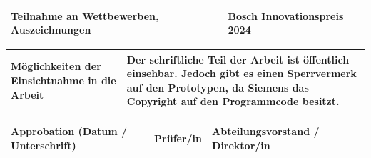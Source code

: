 \vspace{0.5cm}

\begin{tabular}{|p{53mm}|p{103mm}|}
\hline
\vspace{-0.11cm} Teilnahme an \newline Wettbewerben, \newline Auszeichnungen \vspace{0.11cm} &
\vspace{-0.11cm} Bosch Innovationspreis 2024 \vspace{0.11cm} \\
\hline
\end{tabular}

\vspace{0.5cm}

\begin{tabular}{|p{53mm}|p{103mm}|}
\hline
\vspace{-0.11cm} Möglichkeiten der \newline Einsichtnahme in die Arbeit \vspace{0.11cm} &
\vspace{-0.11cm} Der schriftliche Teil der Arbeit ist öffentlich einsehbar. Jedoch gibt es einen Sperrvermerk auf den Prototypen, da Siemens das Copyright auf den Programmcode besitzt. \vspace{0.11cm} \\
\hline
\end{tabular}

\vspace{0.5cm}

\begin{tabular}{|p{5.3cm}|p{4.93cm}|p{4.93cm}|@{}m{0cm}@{}}
\hline
\vspace{-0.11cm} Approbation \newline (Datum / Unterschrift) \vspace{0.11cm} & 
\vspace{-0.11cm} Prüfer/in  \vspace{0.11cm} &
\vspace{-0.11cm} Abteilungsvorstand / \newline Direktor/in \vspace{0.11cm} & \\ [4cm]
\hline
\end{tabular}